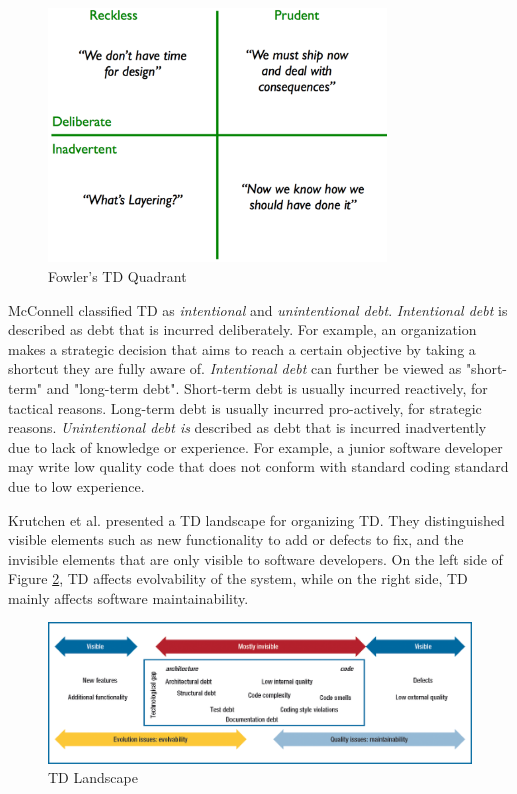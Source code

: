 \begin{figure}[ht!]
	\centering
	\includegraphics[width=0.8\textwidth]{images/techDebtQuadrant.png}
	\caption{Fowler's TD Quadrant}
	\label{fig:techDebtQuad}
\end{figure}

McConnell\cite{url-mcconnell} classified TD as \textit{intentional} and \textit{unintentional debt}. \textit{Intentional debt} is described as debt that is incurred deliberately. For example, an organization makes a strategic decision that aims to reach a certain objective by taking a shortcut they are fully aware of. \textit{Intentional debt} can further be viewed as "short-term" and "long-term debt"\cite{p8-codabux,mcconnel-slides}. Short-term debt is usually incurred reactively, for tactical reasons. Long-term debt is usually incurred pro-actively, for strategic reasons. \textit{Unintentional debt is} described as debt that is incurred inadvertently due to lack of knowledge or experience. For example, a junior software developer may write low quality code that does not conform with standard coding standard due to low experience. 

Krutchen et al.\cite{krutchen} presented a TD landscape for organizing TD. They distinguished visible elements such as new functionality to add or defects to fix, and the invisible elements that are only visible to software developers. On the left side of Figure \ref{fig:techDebtLandscape}, TD affects evolvability of the system, while on the right side, TD mainly affects software maintainability. 

\begin{figure}[ht!]
	\centering
	\includegraphics[width=1.0\textwidth]{images/techDebtLandscape.png}
	\caption{TD Landscape}
	\label{fig:techDebtLandscape}
\end{figure}

